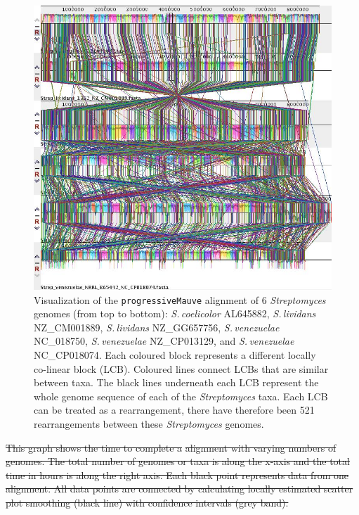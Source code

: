 \documentclass[11pt]{article}
\newcommand{\strep}{\textit{Streptomyces}\xspace}
\newcommand{\ecol}{\textit{E.\,coli}\xspace}
\newcommand{\p}{\texttt{progressiveMauve}\xspace}
\newcommand{\sliv}{\textit{S.\,lividans}\xspace}
\newcommand{\sven}{\textit{S.\,venezuelae}\xspace}
\newcommand{\scoe}{\textit{S.\,coelicolor}\xspace}
\providecommand{\DIFdeltex}[1]{{\protect\color{red}\sout{#1}}}                      %
\providecommand{\DIFaddbegin}{} %
\providecommand{\DIFdelbegin}{} %
\providecommand{\DIFdelend}{} %
\providecommand{\DIFaddendFL}{} %
\providecommand{\DIFdel}[1]{\texorpdfstring{\DIFdeltex{#1}}{}} %
\begin{document}
\DIFdelbegin %
\DIFdelend \DIFaddbegin \begin{figure}[!h]
	\DIFaddendFL \begin{center}
		\includegraphics[width=\textwidth]{./figs/6_strep_strains_mauve_aln_pic}
		\caption{\label{fig:strep6mauvealn} Visualization of the \p alignment of 6 \strep genomes (from top to bottom): \scoe AL645882, \sliv NZ\_CM001889, \sliv NZ\_GG657756, \sven NC\_018750, \sven NZ\_CP013129, and \sven NC\_CP018074. Each coloured block represents a different locally co-linear block (LCB). Coloured lines connect LCBs that are similar between taxa. The black lines underneath each LCB represent the whole genome sequence of each of the \strep taxa. Each LCB can be treated as a rearrangement, there have therefore been 521 rearrangements between these \strep genomes.}
	\end{center}
\end{figure}


\DIFdelbegin %
{%
\DIFdel{This graph shows the time to complete a }%
\DIFdel{alignment with varying numbers of }%
\DIFdel{genomes. The total number of genomes or taxa is along the x-axis and the total time in hours is along the right axis. Each black point represents data from one }%
\DIFdel{alignment. All data points are connected by calculating locally estimated scatter plot smoothing (black line) with confidence intervals (grey band).}}
\end{document}
